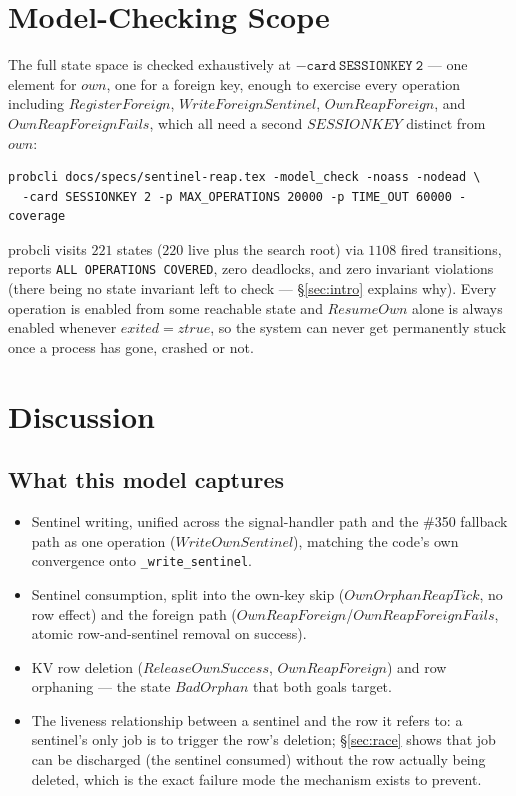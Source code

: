 \documentclass[a4paper,10pt,fleqn]{article}
\begin{document}
\section{Model-Checking Scope}

The full state space is checked exhaustively at $\mathtt{-card\
SESSIONKEY\ 2}$ --- one element for $own$, one for a foreign key,
enough to exercise every operation including $RegisterForeign$,
$WriteForeignSentinel$, $OwnReapForeign$, and
$OwnReapForeignFails$, which all need a second $SESSIONKEY$ distinct
from $own$:

\begin{verbatim}
probcli docs/specs/sentinel-reap.tex -model_check -noass -nodead \
  -card SESSIONKEY 2 -p MAX_OPERATIONS 20000 -p TIME_OUT 60000 -coverage
\end{verbatim}

probcli visits $221$ states ($220$ live plus the search root) via
$1108$ fired transitions, reports \texttt{ALL OPERATIONS COVERED}, zero
deadlocks, and zero invariant violations (there being no state
invariant left to check --- \S\ref{sec:intro} explains why).  Every
operation is enabled from some reachable state and $ResumeOwn$ alone is
always enabled whenever $exited = ztrue$, so the system can never get
permanently stuck once a process has gone, crashed or not.

\section{Discussion}

\subsection{What this model captures}

\begin{itemize}
  \item Sentinel writing, unified across the signal-handler path and
    the \#350 fallback path as one operation ($WriteOwnSentinel$),
    matching the code's own convergence onto \texttt{\_write\_sentinel}.
  \item Sentinel consumption, split into the own-key skip
    ($OwnOrphanReapTick$, no row effect) and the foreign path
    ($OwnReapForeign$/$OwnReapForeignFails$, atomic row-and-sentinel
    removal on success).
  \item KV row deletion ($ReleaseOwnSuccess$, $OwnReapForeign$) and
    row orphaning --- the state $BadOrphan$ that both goals target.
  \item The liveness relationship between a sentinel and the row it
    refers to: a sentinel's only job is to trigger the row's deletion;
    \S\ref{sec:race} shows that job can be discharged (the sentinel
    consumed) without the row actually being deleted, which is the
    exact failure mode the mechanism exists to prevent.
\end{itemize}
\end{document}
